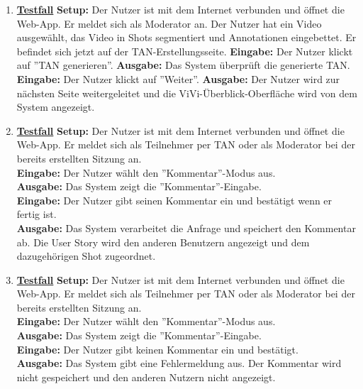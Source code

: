 \begin{enumerate}
	\item \underline{\textbf{Testfall}} \linebreak
	\textbf{Setup:} Der Nutzer ist mit dem Internet verbunden und öffnet die Web-App. Er meldet sich als Moderator an. Der Nutzer hat ein Video ausgewählt, das Video in Shots segmentiert und Annotationen eingebettet. Er befindet sich jetzt auf der TAN-Erstellungsseite.\linebreak
	\textbf{Eingabe:} Der Nutzer klickt auf ''TAN generieren''.\linebreak
	\textbf{Ausgabe:} Das System überprüft die generierte TAN.\linebreak
	\textbf{Eingabe:} Der Nutzer klickt auf ''Weiter''.\linebreak
	\textbf{Ausgabe:} Der Nutzer wird zur nächsten Seite weitergeleitet und die ViVi-Überblick-Oberfläche wird von dem System angezeigt.
	
	\item \underline{\textbf{Testfall}} \linebreak
	\textbf{Setup:} Der Nutzer ist mit dem Internet verbunden und öffnet die Web-App. Er meldet sich als Teilnehmer per TAN oder als Moderator bei der bereits erstellten Sitzung an.\\
	\textbf{Eingabe:} Der Nutzer wählt den ''Kommentar''-Modus aus. \\
	\textbf{Ausgabe:} Das System zeigt die ''Kommentar''-Eingabe. \\
	\textbf{Eingabe:} Der Nutzer gibt seinen Kommentar ein und bestätigt wenn er fertig ist.\\
	\textbf{Ausgabe:} Das System verarbeitet die Anfrage und speichert den Kommentar ab. Die User Story wird den anderen Benutzern angezeigt und dem dazugehörigen Shot zugeordnet. \\
	
	\item \underline{\textbf{Testfall}} \linebreak
	\textbf{Setup:} Der Nutzer ist mit dem Internet verbunden und öffnet die Web-App. Er meldet sich als Teilnehmer per TAN oder als Moderator bei der bereits erstellten Sitzung an.\\
	\textbf{Eingabe:} Der Nutzer wählt den ''Kommentar''-Modus aus. \\
	\textbf{Ausgabe:} Das System zeigt die ''Kommentar''-Eingabe. \\
	\textbf{Eingabe:} Der Nutzer gibt keinen Kommentar ein und bestätigt.\\
	\textbf{Ausgabe:} Das System gibt eine Fehlermeldung aus. Der Kommentar wird nicht gespeichert und den anderen Nutzern nicht angezeigt. \\
	

\end{enumerate}
